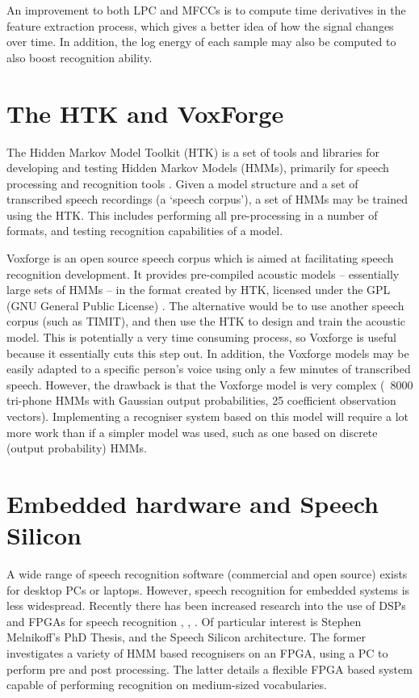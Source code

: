 An improvement to both LPC and MFCCs is to compute time derivatives in the feature extraction process, which gives a better idea of how the signal changes over time.  In addition, the log energy of each sample may also be computed to also boost recognition ability.



\section{The HTK and VoxForge} %
\label{sec:the_htk}
The Hidden Markov Model Toolkit (HTK) is a set of tools and libraries for developing and testing Hidden Markov Models (HMMs), primarily for speech processing and recognition tools \cite{htkbook}.  Given a model structure and a set of transcribed speech recordings (a `speech corpus'), a set of HMMs may be trained using the HTK.  This includes performing all pre-processing in a number of formats, and testing recognition capabilities of a model.

Voxforge is an open source speech corpus which is aimed at facilitating speech recognition development.  It provides pre-compiled acoustic models -- essentially large sets of HMMs -- in the format created by HTK, licensed under the GPL (GNU General Public License) \cite{voxforge}.  The alternative would be to use another speech corpus (such as TIMIT), and then use the HTK to design and train the acoustic model.  This is potentially a very time consuming process, so Voxforge is useful because it essentially cuts this step out.  In addition, the Voxforge models may be easily adapted to a specific person's voice using only a few minutes of transcribed speech.  However, the drawback is that the Voxforge model is very complex (~8000 tri-phone HMMs with Gaussian output probabilities, 25 coefficient observation vectors).  Implementing a recogniser system based on this model will require a lot more work than if a simpler model was used, such as one based on discrete (output probability) HMMs.


\section{Embedded hardware and Speech Silicon} %
\label{sec:embedded_hardware}
A wide range of speech recognition software (commercial and open source) exists for desktop PCs or laptops.  However, speech recognition for embedded systems is less widespread.  Recently there has been increased research into the use of DSPs and FPGAs for speech recognition \cite{melnikoff2003speech}, \cite{schuster2006speech}, \cite{nedevschi2005hardware}.  Of particular interest is Stephen Melnikoff's PhD Thesis, and the Speech Silicon architecture.  The former investigates a variety of HMM based recognisers on an FPGA, using a PC to perform pre and post processing.  The latter details a flexible FPGA based system capable of performing recognition on medium-sized vocabularies.


